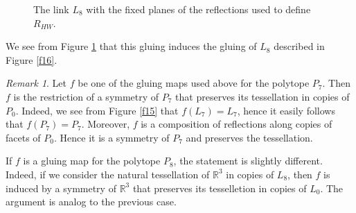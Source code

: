\documentclass{amsart}
\theoremstyle{definition}
\theoremstyle{remark}
\newtheorem{rem}[lemma]{Remark}
\newcommand{\matR} {\ensuremath {\mathbb{R}}}
\begin{document}
\begin{figure}

    \caption{The link $L_8$ with the fixed planes of the reflections used to define $R_{HW}$.}\label{f17}
\end{figure}

We see from Figure \ref{f17} that this gluing induces the gluing of $L_8$ described in Figure \ref{f16}.


\begin{rem}
\label{identity}
    Let $f$ be one of the gluing maps used above for the polytope $P_7$. Then $f$ is the restriction of a symmetry of $P_7$ that preserves its tessellation in copies of $P_0$. Indeed, we see from Figure \ref{f15} that $f(L_7)=L_7$, hence it easily follows that $f(P_7)=P_7$. Moreover, $f$ is a composition of reflections along copies of facets of $P_0$. Hence it is a symmetry of $P_7$ and preserves the tessellation.

    If $f$ is a gluing map for the polytope $P_8$, the statement is slightly different. Indeed, if we consider the natural tessellation of $\matR^3$ in copies of $L_8$, then $f$ is induced by a symmetry of $\matR^3$ that preserves its tesselletion in copies of $L_0$. The argument is analog to the previous case.
\end{rem}
\end{document}
